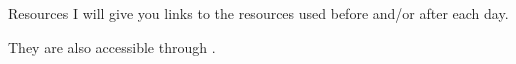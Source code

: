 \begin{frame}{Resources}
  I will give you links to the resources used before and/or after each day.

  They are also accessible through .
\end{frame}
